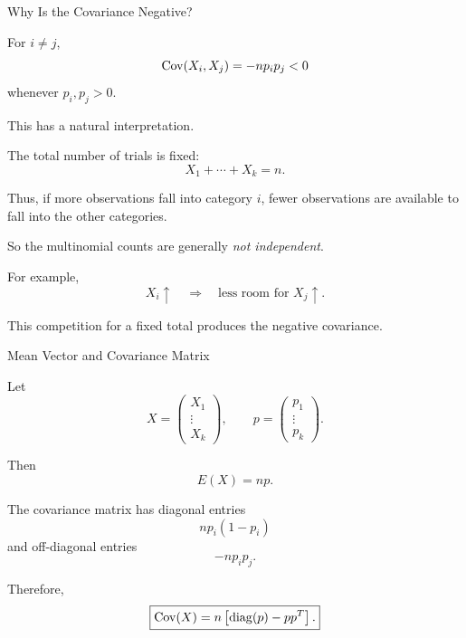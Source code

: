 \begin{frame}{Why Is the Covariance Negative?}

For $i\neq j$,
\[
\operatorname{Cov}(X_i,X_j)=-np_ip_j<0
\]
whenever $p_i,p_j>0$.

This has a natural interpretation.

The total number of trials is fixed:
\[
X_1+\cdots+X_k=n.
\]

Thus, if more observations fall into category $i$, fewer observations
are available to fall into the other categories.

So the multinomial counts are generally \emph{not independent}.

For example,
\[
X_i\uparrow
\quad\Longrightarrow\quad
\text{less room for }X_j\uparrow.
\]

This competition for a fixed total produces the negative covariance.

\end{frame}

\begin{frame}{Mean Vector and Covariance Matrix}

Let
\[
X=
\begin{pmatrix}
X_1\\
\vdots\\
X_k
\end{pmatrix},
\qquad
p=
\begin{pmatrix}
p_1\\
\vdots\\
p_k
\end{pmatrix}.
\]

Then
\[
\boxed{
E(X)=np.
}
\]

The covariance matrix has diagonal entries
\[
np_i(1-p_i)
\]
and off-diagonal entries
\[
-np_ip_j.
\]

Therefore,
\[
\boxed{
\operatorname{Cov}(X)
=
n\left[
\operatorname{diag}(p)-pp^{T}
\right].
}
\]

\end{frame}























